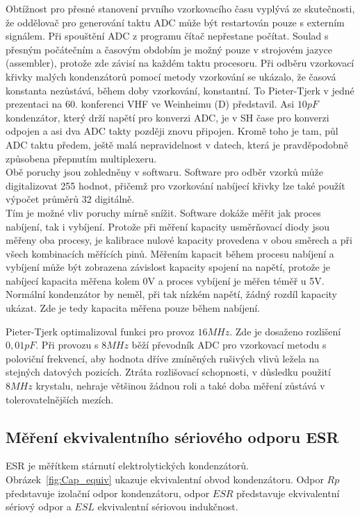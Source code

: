 Obtížnost pro přesné stanovení prvního vzorkovacího času vyplývá ze skutečnosti, že
oddělovač pro generování taktu ADC může být restartován pouze s externím signálem.
Při spouštění ADC z programu  čítač nepřestane počítat.
Soulad s přesným počátečním a časovým obdobím je možný pouze v strojovém jazyce (assembler),
protože zde závisí na každém taktu procesoru.
Při odběru vzorkovací křivky malých kondenzátorů pomocí metody vzorkování se ukázalo,
že časová konstanta nezůstává, během doby vzorkování, konstantní. To Pieter-Tjerk v jedné
prezentaci na 60. konferenci VHF ve Weinheimu (D) představil.
Asi \(10pF\) kondenzátor, který drží napětí pro konverzi ADC,
je v SH čase pro konverzi odpojen a asi dva ADC takty později znovu připojen.
Kromě toho je tam, půl ADC taktu předem, ještě malá nepravidelnost v datech, která je pravděpodobně
způsobena přepnutím multiplexeru.\\ Obě poruchy jsou zohledněny v softwaru.
Software pro odběr vzorků může digitalizovat 255 hodnot, přičemž pro vzorkování nabíjecí křivky lze
také použít výpočet průměrů 32 digitálně.\\ Tím je možné vliv poruchy mírně snížit.
Software dokáže měřit jak proces nabíjení, tak i vybíjení.
Protože při měření kapacity usměrňovací diody jsou měřeny oba procesy,
je kalibrace nulové kapacity provedena v obou směrech a při všech kombinacích měřících pinů.
Měřením kapacit během procesu nabíjení a vybíjení může být zobrazena závislost kapacity spojení na napětí,
protože je nabíjecí kapacita měřena kolem 0V a proces vybíjení je měřen téměř u 5V.
Normální kondenzátor by neměl, při tak nízkém napětí, žádný rozdíl kapacity ukázat.
Zde je tedy kapacita měřena pouze během nabíjení.

Pieter-Tjerk optimalizoval funkci pro provoz \(16MHz\). Zde je dosaženo rozlišení \(0,01pF\).
Při provozu s \(8MHz\) běží převodník ADC pro vzorkovací metodu s poloviční frekvencí, aby hodnota
dříve zmíněných rušivých vlivů ležela na stejných datových pozicích.
Ztráta rozlišovací schopnosti, v důsledku použití \(8MHz\) krystalu, nehraje většinou žádnou roli
a také doba měření zůstává v tolerovatelnějších mezích.

\subsection{Měření ekvivalentního sériového odporu ESR}

ESR \cite{ESR}  je měřítkem stárnutí elektrolytických kondenzátorů.
Obrázek~\ref{fig:Cap_equiv} ukazuje ekvivalentní obvod kondenzátoru.
Odpor \(Rp\) představuje izolační odpor kondenzátoru,
odpor \(ESR\) představuje ekvivalentní sériový odpor
a \(ESL\) ekvivalentní sériovou indukčnost.


